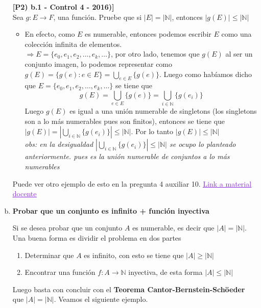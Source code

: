 \documentclass[letterpaper,12pt]{article}
\newcommand{\N}{\mathbb N}
\theoremstyle{plain}
\begin{document}
\begin{enumerate}[a)]
        \textbf{[P2) b.1 - Control 4 - 2016)]}\\ Sea $g:E \to F$, una función. Pruebe que si $|E|=|\N|$, entonces $|g(E)|\leq|\N|$
        \begin{itemize}
            \item En efecto, como $E$ es numerable, entonces podemos escribir $E$ como una colección infinita de elementos.\\
        $\Longrightarrow E=\{e_0,e_1,e_2, \dots, e_k, \dots \}$, por otro lado, tenemos que $g(E)$ al ser un conjunto imagen, lo podemos representar como $\displaystyle g(E)=\{ g(e) : e\in E\}=\bigcup_{e \in E}\{g(e)\}$. Luego como habíamos dicho que $E=\{e_0,e_1,e_2, \dots, e_k, \dots \}$ se tiene que\\
        $$\displaystyle  g(E)=\bigcup_{e \in E}\{g(e)\}=\bigcup_{i\in \N}\{g(e_i)\}$$
        Luego $g(E)$ es igual a una unión numerable de singletons (los singletons son a lo más numerables pues son finitos), entonces se tiene que $\displaystyle |g(E)|=|\bigcup_{i\in \N}\{g(e_i)\}| \leq |\N|$. Por lo tanto $|g(E)|\leq |\N|$ \\
    
        \textit{obs: en la desigualdad $|\displaystyle \bigcup_{i\in \N}\{g(e_i)\}| \leq |\N|$ se ocupo lo planteado anteriormente. pues es la unión numerable de conjuntos a lo más numerables}
        
        \end{itemize}
        
        Puede ver otro ejemplo de esto en la pregunta 4 auxiliar 10. \href{https://www.u-cursos.cl/ingenieria/2017/1/MA1101/1/material_docente/}{\textcolor{BlueViolet}{\underline{Link a material docente}}}
        \newpage
        
    \item \textbf{Probar que un conjunto es infinito + función inyectiva}
    
    Si se desea probar que un conjunto $A$ es numerable, es decir que $|A|=|\N|$. Una buena forma es dividir el problema en dos partes
    
    \begin{enumerate}
        \item Determinar que $A$ es infinito, con esto se tiene que $|A|\geq |\N|$
        \item Encontrar una función $f:A \to \N$ inyectiva, de esta forma $|A|\leq |\N|$
    \end{enumerate}
    Luego basta con concluir con el \textbf{Teorema Cantor-Bernstein-Schöeder} que $|A|=|\N|$. Veamos el siguiente ejemplo.
    

\end{enumerate}
\end{document}
